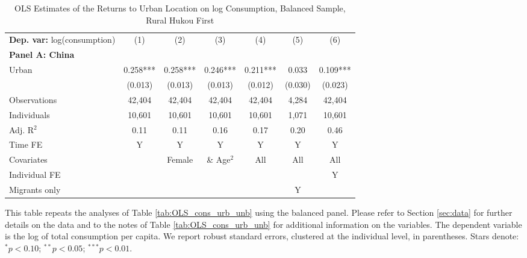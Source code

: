 \begin{table}[htbp] \centering \begin{threeparttable}
 \caption{OLS Estimates of the Returns to Urban Location on log Consumption, Balanced Sample, Rural Hukou First} 
 \label{tab:OLS_CHN_hukou_rural_first_consumption_urban_bal} 
\begin{tabular}{l cccccc} \toprule  \textbf{Dep. var:}  log(consumption) 
                    &\multicolumn{1}{c}{(1)}   &\multicolumn{1}{c}{(2)}   &\multicolumn{1}{c}{(3)}   &\multicolumn{1}{c}{(4)}   &\multicolumn{1}{c}{(5)}   &\multicolumn{1}{c}{(6)}   \\
\textbf{Panel A: China} \\
Urban               &       0.258***&       0.258***&       0.246***&       0.211***&       0.033   &       0.109***\\
                    &     (0.013)   &     (0.013)   &     (0.013)   &     (0.012)   &     (0.030)   &     (0.023)   \\
\addlinespace
Observations        &      42,404   &      42,404   &      42,404   &      42,404   &       4,284   &      42,404   \\
Individuals         &      10,601   &      10,601   &      10,601   &      10,601   &       1,071   &      10,601   \\
Adj. R$^{2}$        &        0.11   &        0.11   &        0.16   &        0.17   &        0.20   &        0.46   \\
\cmidrule{2 -7} Time FE & Y & Y & Y & Y & Y & Y \\ Covariates & & Female & \& Age$^2$ & All & All & All \\ Individual FE & & & & & & Y \\ Migrants only & & & & & Y & \\ \bottomrule \end{tabular} \begin{tablenotes}[flushleft] \footnotesize \item{This table repeats the analyses of Table \ref{tab:OLS_cons_urb_unb}  using the balanced panel. Please refer to Section \ref{sec:data} for further details on the data and to the notes of Table \ref{tab:OLS_cons_urb_unb} for additional information on the variables. The dependent variable is the log of total consumption per capita. We report robust standard errors, clustered at the individual level, in parentheses. Stars denote: $^{*} p<0.10$; $^{**} p<0.05$; $^{***} p<0.01$.} \end{tablenotes} \end{threeparttable} \end{table}
